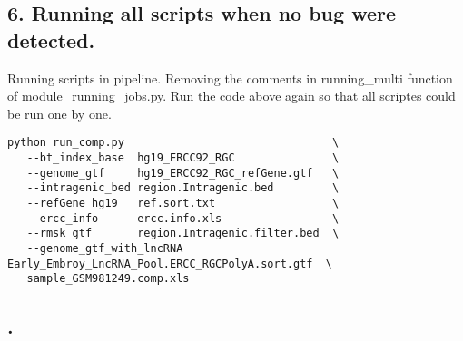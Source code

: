 \subsection{6. Running all scripts when no bug were detected.}
\begin{frame}[c,fragile]

	\begin{block}{ Running scripts in pipeline. }
Removing the comments in \alert{running\_multi} function of \alert{module\_running\_jobs.py}. Run the code above again so that all scriptes could be run one by one.
		\begin{lstlisting}[basicstyle=\tiny]
python run_comp.py                                \
   --bt_index_base  hg19_ERCC92_RGC               \
   --genome_gtf     hg19_ERCC92_RGC_refGene.gtf   \
   --intragenic_bed region.Intragenic.bed         \
   --refGene_hg19   ref.sort.txt                  \
   --ercc_info      ercc.info.xls                 \
   --rmsk_gtf       region.Intragenic.filter.bed  \
   --genome_gtf_with_lncRNA  Early_Embroy_LncRNA_Pool.ERCC_RGCPolyA.sort.gtf  \
   sample_GSM981249.comp.xls
		\end{lstlisting}
	\end{block}
\end{frame}




\subsection{.}